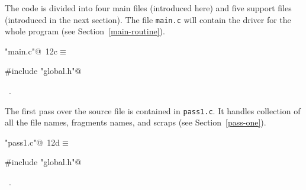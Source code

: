 \documentclass[a4paper]{report}
\begin{document}
The code is divided into four main files (introduced here) and five
support files (introduced in the next section).
The file \verb|main.c| will contain the driver for the whole program
(see Section~\ref{main-routine}).
\begin{flushleft} \small
\begin{minipage}{\linewidth}\label{scrap5}\raggedright\small
{} \verb@"main.c"@\nobreak\ {\footnotesize {12c}}$\equiv$
\vspace{-1ex}
\begin{list}{}{} \item
\mbox{}\verb@#include "global.h"@\\
\mbox{}\verb@@{\NWsep}
\end{list}
\vspace{-1.5ex}
\footnotesize
\begin{list}{}{\setlength{\itemsep}{-\parsep}\setlength{\itemindent}{-\leftmargin}}
\item \NWtxtFileDefBy\ .

\item{}
\end{list}
\end{minipage}\vspace{4ex}
\end{flushleft}
The first pass over the source file is contained in \verb|pass1.c|.
It handles collection of all the file names, fragments names, and scraps
(see Section~\ref{pass-one}).
\begin{flushleft} \small
\begin{minipage}{\linewidth}\label{scrap6}\raggedright\small
{} \verb@"pass1.c"@\nobreak\ {\footnotesize {12d}}$\equiv$
\vspace{-1ex}
\begin{list}{}{} \item
\mbox{}\verb@#include "global.h"@\\
\mbox{}\verb@@{\NWsep}
\end{list}
\vspace{-1.5ex}
\footnotesize
\begin{list}{}{\setlength{\itemsep}{-\parsep}\setlength{\itemindent}{-\leftmargin}}
\item \NWtxtFileDefBy\ .

\item{}
\end{list}
\end{minipage}\vspace{4ex}
\end{flushleft}
\end{document}
